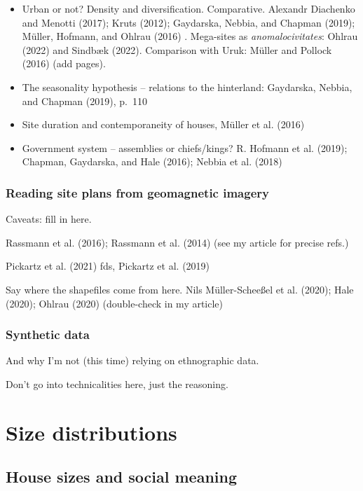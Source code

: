 \documentclass[
  12pt,
  a4paper, twoside]{book}
\begin{document}
\begin{itemize}
\item
  Urban or not? Density and diversification. Comparative. Alexandr Diachenko and Menotti (2017); Kruts (2012); Gaydarska, Nebbia, and Chapman (2019); Müller, Hofmann, and Ohlrau (2016) . Mega-sites as \emph{anomalocivitates}: Ohlrau (2022) and Sindbæk (2022). Comparison with Uruk: Müller and Pollock (2016) (add pages).
\item
  The seasonality hypothesis -- relations to the hinterland: Gaydarska, Nebbia, and Chapman (2019), p.~110
\item
  Site duration and contemporaneity of houses, Müller et al. (2016)
\item
  Government system -- assemblies or chiefs/kings? R. Hofmann et al. (2019); Chapman, Gaydarska, and Hale (2016); Nebbia et al. (2018)
\end{itemize}

\hypertarget{reading-site-plans-from-geomagnetic-imagery}{%
\section{Reading site plans from geomagnetic imagery}\label{reading-site-plans-from-geomagnetic-imagery}}

Caveats: fill in here.

Rassmann et al. (2016); Rassmann et al. (2014) (see my article for precise refs.)

Pickartz et al. (2021) fds, Pickartz et al. (2019)

Say where the shapefiles come from here. Nils Müller-Scheeßel et al. (2020); Hale (2020); Ohlrau (2020) (double-check in my article)

\hypertarget{synthetic-data}{%
\section{Synthetic data}\label{synthetic-data}}

And why I'm not (this time) relying on ethnographic data.

Don't go into technicalities here, just the reasoning.

\hypertarget{part-size-distributions}{%
\part{Size distributions}\label{part-size-distributions}}

\hypertarget{house-sizes-theory}{%
\chapter{House sizes and social meaning}\label{house-sizes-theory}}
\end{document}

